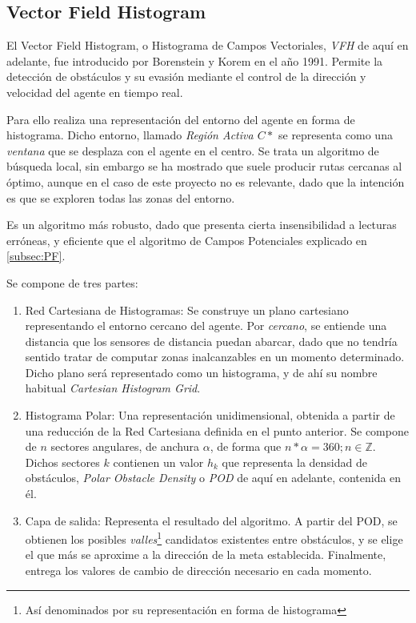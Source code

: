\subsection{Vector Field Histogram}
\label{subsec:VFH}
El Vector Field Histogram, o Histograma de Campos Vectoriales, \textit{VFH} de aquí en adelante, fue introducido por Borenstein y Korem en el año 1991. Permite la detección de obstáculos y su evasión mediante el control de la dirección y velocidad del agente en tiempo 
real.

Para ello realiza una representación del entorno del agente en forma de histograma. Dicho entorno, llamado \textit{Región Activa $C*$} se representa como una \textit{ventana} que se desplaza con el agente en el centro. Se trata un algoritmo de búsqueda local, sin embargo se ha mostrado que suele producir rutas cercanas al óptimo, aunque en el caso de este proyecto no es relevante, dado que la intención es que se exploren todas las zonas del entorno.

Es un algoritmo más robusto, dado que presenta cierta insensibilidad a lecturas erróneas, y eficiente que el algoritmo de Campos Potenciales explicado en \ref{subsec:PF}. 

Se compone de tres partes: 
\begin{enumerate}
\item Red Cartesiana de Histogramas: Se construye un plano cartesiano representando el entorno cercano del agente. Por \textit{cercano}, se entiende una distancia que los sensores de distancia puedan abarcar, dado que no tendría sentido tratar de computar zonas inalcanzables en un momento determinado. Dicho plano será representado como un histograma, y de ahí su nombre habitual \textit{Cartesian Histogram Grid}.
\item Histograma Polar: Una representación unidimensional, obtenida a partir de una reducción de la Red Cartesiana definida en el punto anterior. Se compone de $n$ sectores angulares, de anchura $\alpha$, de forma que $n * \alpha = 360; n \in \mathbb{Z}$. Dichos sectores $k$ contienen un valor $h_k$ que representa la densidad de obstáculos, \textit{Polar Obstacle Density} o \textit{POD} de aquí en adelante, contenida en él.
\item Capa de salida: Representa el resultado del algoritmo. A partir del POD, se obtienen los posibles \textit{valles}\footnote{Así denominados por su representación en forma de histograma} candidatos existentes entre obstáculos, y se elige el que más se aproxime a la dirección de la meta establecida. Finalmente, entrega los valores de cambio de dirección necesario en cada momento.
\end{enumerate}

